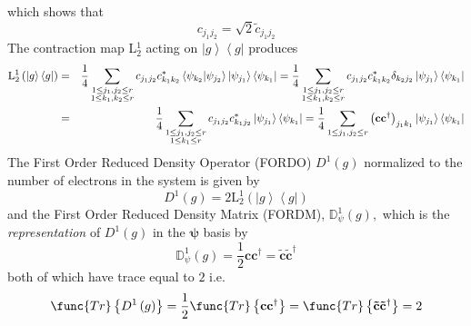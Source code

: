 \documentclass[aps,preprint]{revtex4}
\begin{document}
which shows that 
\begin{equation}
c_{j_{1}j_{2}}=\sqrt{2}\tilde{c}_{j_{1}j_{2}}
\end{equation}%
The contraction map \textrm{L}$_{2}^{1}$ acting on $\left\vert
g\right\rangle \left\langle g\right\vert $ produces 
\begin{eqnarray}
\mathrm{L}_{2}^{1}\left( \left\vert g\right\rangle \left\langle g\right\vert
\right)  &=&\frac{1}{4}\sum_{\substack{ 1\leq j_{1},j_{2}\leq r \\ 1\leq
k_{1},k_{2}\leq r}}c_{j_{1}j_{2}}c_{k_{1}k_{2}}^{\ast }\left\langle \psi
_{k_{2}}|\psi _{j_{2}}\right\rangle \left\vert \psi _{j_{1}}\right\rangle
\left\langle \psi _{k_{1}}\right\vert =\frac{1}{4}\sum_{\substack{ 1\leq
j_{1},j_{2}\leq r \\ 1\leq k_{1},k_{2}\leq r}}c_{j_{1}j_{2}}c_{k_{1}k_{2}}^{%
\ast }\delta _{k_{2}j_{2}}\left\vert \psi _{j_{1}}\right\rangle \left\langle
\psi _{k_{1}}\right\vert   \notag \\
&=&\frac{1}{4}\sum_{\substack{ 1\leq j_{1},j_{2}\leq r \\ 1\leq k_{1}\leq r}}%
c_{j_{1}j_{2}}c_{k_{1}j_{2}}^{\ast }\left\vert \psi _{j_{1}}\right\rangle
\left\langle \psi _{k_{1}}\right\vert =\frac{1}{4}\sum_{1\leq
j_{1},j_{2}\leq r}\left( \mathbf{cc}^{\dagger }\right)
_{j_{1}k_{1}}\left\vert \psi _{j_{1}}\right\rangle \left\langle \psi
_{k_{1}}\right\vert 
\end{eqnarray}%
The First Order Reduced Density Operator (FORDO) $D^{1}\left( g\right) $
normalized to the number of electrons in the system is given by 
\begin{equation}
D^{1}\left( g\right) =2\mathrm{L}_{2}^{1}\left( \left\vert g\right\rangle
\left\langle g\right\vert \right) 
\end{equation}%
and the First Order Reduced Density Matrix (FORDM), $\mathbb{D}_{\psi
}^{1}\left( g\right) ,$ which is the \emph{representation} of $D^{1}\left(
g\right) $ in the $\mathbf{\psi }$ basis by 
\begin{equation}
\mathbb{D}_{\psi }^{1}\left( g\right) =\frac{1}{2}\mathbf{cc}^{\dagger }=%
\mathbf{\tilde{c}\tilde{c}}^{\dagger }
\end{equation}%
both of which have trace equal to $2$ i.e. 
\begin{equation}
\func{Tr}\left\{ D^{1}\left( g\right) \right\} =\frac{1}{2}\func{Tr}\left\{ 
\mathbf{cc}^{\dagger }\right\} =\func{Tr}\left\{ \mathbf{\tilde{c}\tilde{c}}%
^{\dagger }\right\} =2
\end{equation}%
\end{document}
